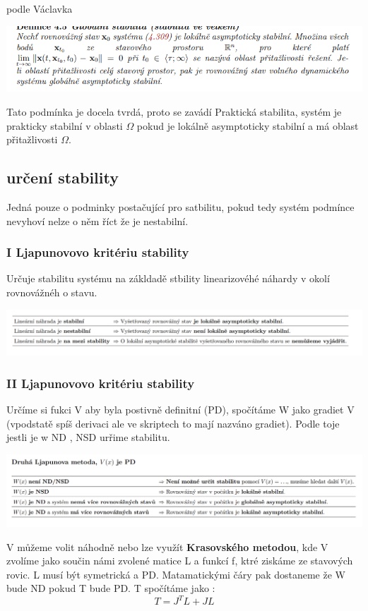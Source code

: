 podle Václavka

\includegraphics{img/vaclavek.golbal.png}

Tato podmínka je docela tvrdá, proto se zavádí Praktická stabilita, systém je prakticky stabilní v oblasti $\Omega$ pokud je lokálně asymptoticky stabilní a má oblast přitažlivosti $\Omega$.


\subsection*{určení stability}
Jedná pouze o podminky postačující pro satbilitu, pokud tedy systém podmínce nevyhoví nelze o něm říct že je nestabilní.
\subsubsection{I Ljapunovovo kritériu stability}
Určuje stabilitu systému na zákldadě stbility linearizovéhé náhardy v okolí rovnovážnéh o stavu.

\noindent \includegraphics[scale = 0.6]{img/Ljap.1.png}


\subsubsection{II Ljapunovovo kritériu stability}
Určíme si fukci V aby byla postivně definitní (PD), spočítáme W jako gradiet V (vpodstatě spíš derivaci ale ve skriptech to mají nazváno gradiet). Podle toje jestli je w ND , NSD urřime stabilitu.

\includegraphics[scale = 0.6]{img/Ljap.2.png}

V můžeme volit náhodně nebo lze využít {\bf Krasovského metodou}, kde V zvolíme jako součin námi zvolené matice L a funkcí f, ktré ziskáme ze stavových rovic.
L musí být symetrická a PD. Matamatickými čáry pak dostaneme že W bude ND pokud T bude PD.
T spočítáme jako :
\begin{equation*}
    T=J^TL+JL
\end{equation*}

